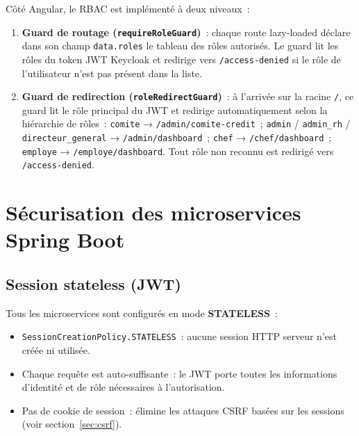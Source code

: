 Côté Angular, le RBAC est implémenté à deux niveaux~:

\begin{enumerate}[leftmargin=*,nosep]
  \item \textbf{Guard de routage (\texttt{requireRoleGuard})}~: chaque route lazy-loaded
        déclare dans son champ \texttt{data.roles} le tableau des rôles autorisés.
        Le guard lit les rôles du token JWT Keycloak et redirige vers \texttt{/access-denied}
        si le rôle de l’utilisateur n’est pas présent dans la liste.
  \item \textbf{Guard de redirection (\texttt{roleRedirectGuard})}~: à l'arrivée
        sur la racine \texttt{/}, ce guard lit le rôle principal du JWT et redirige
        automatiquement selon la hiérarchie de rôles~: \texttt{comite} →
        \texttt{/admin/comite-credit}~; \texttt{admin} / \texttt{admin\_rh} /
        \texttt{directeur\_general} → \texttt{/admin/dashboard}~;
        \texttt{chef} → \texttt{/chef/dashboard}~;
        \texttt{employe} → \texttt{/employe/dashboard}.
        Tout rôle non reconnu est redirigé vers \texttt{/access-denied}.
\end{enumerate}

\section{Sécurisation des microservices Spring Boot}

\subsection{Session stateless (JWT)}

Tous les microservices sont configurés en mode \textbf{STATELESS}~:

\begin{itemize}[leftmargin=*,nosep]
  \item \texttt{SessionCreationPolicy.STATELESS}~: aucune session HTTP serveur
        n’est créée ni utilisée.
  \item Chaque requête est auto-suffisante~: le JWT porte toutes les informations
        d’identité et de rôle nécessaires à l’autorisation.
  \item Pas de cookie de session~: élimine les attaques CSRF basées sur les
        sessions (voir section~\ref{sec:csrf}).
\end{itemize}

